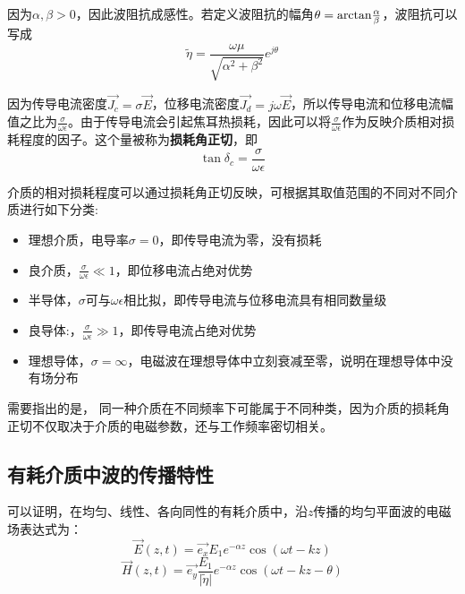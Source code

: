 \documentclass[UTF8,a4paper,11pt]{article}
\begin{document}
因为$\alpha,\beta>0$，因此波阻抗成感性。若定义波阻抗的幅角$\theta={\rm arctan}\frac{\alpha}{\beta}$，波阻抗可以写成
\begin{equation}
\widetilde{\eta}=\frac{\omega\mu}{\sqrt{\alpha^2+\beta^2}}e^{j\theta}
\end{equation}

因为传导电流密度$\overrightarrow{J_c}=\sigma\overrightarrow{E}$，位移电流密度$\overrightarrow{J_d}=j\omega\overrightarrow{E}$，所以传导电流和位移电流幅值之比为$\frac{\sigma}{\omega\epsilon}$。由于传导电流会引起焦耳热损耗，因此可以将$\frac{\sigma}{\omega\epsilon}$作为反映介质相对损耗程度的因子。这个量被称为\textbf{损耗角正切}，即
\begin{equation}
\tan\delta_c=\frac{\sigma}{\omega\epsilon}
\end{equation}

介质的相对损耗程度可以通过损耗角正切反映，可根据其取值范围的不同对不同介质进行如下分类:
\begin{itemize}
\item 理想介质，电导率$\sigma=0$，即传导电流为零，没有损耗
\item 良介质，$\frac{\sigma}{\omega\epsilon}\ll1$，即位移电流占绝对优势
\item 半导体，$\sigma$可与$\omega\epsilon$相比拟，即传导电流与位移电流具有相同数量级
\item 良导体:，$\frac{\sigma}{\omega\epsilon}\gg1$，即传导电流占绝对优势
\item 理想导体，$\sigma=\infty$，电磁波在理想导体中立刻衰减至零，说明在理想导体中没有场分布
\end{itemize}

需要指出的是， 同一种介质在不同频率下可能属于不同种类，因为介质的损耗角正切不仅取决于介质的电磁参数，还与工作频率密切相关。

\subsection{有耗介质中波的传播特性}
可以证明，在均匀、线性、各向同性的有耗介质中，沿$z$传播的均匀平面波的电磁场表达式为：
\begin{equation}
\overrightarrow{E}(z,t)=\overrightarrow{e_x}E_1e^{-\alpha z}\cos(\omega t-kz)
\end{equation}
\begin{equation}
\overrightarrow{H}(z,t)=\overrightarrow{e_y}\frac{E_1}{\lvert\widetilde{\eta}\rvert}e^{-\alpha z}\cos(\omega t-kz-\theta)
\end{equation}
\end{document}
